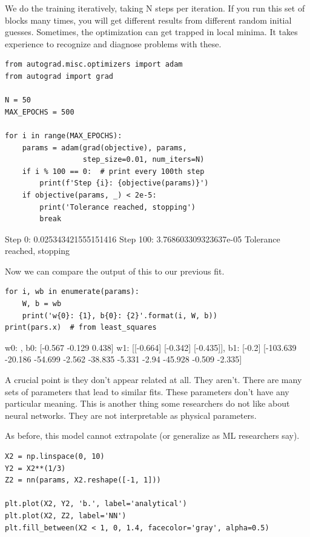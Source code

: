 \documentclass[11pt]{article}
\begin{document}
We do the training iteratively, taking N steps per iteration. If you run this set of blocks many times, you will get different results from different random initial guesses. Sometimes, the optimization can get trapped in local minima. It takes experience to recognize and diagnose problems with these.


\begin{verbatim}
from autograd.misc.optimizers import adam
from autograd import grad

N = 50
MAX_EPOCHS = 500

for i in range(MAX_EPOCHS):
    params = adam(grad(objective), params,
                  step_size=0.01, num_iters=N)
    if i % 100 == 0:  # print every 100th step
        print(f'Step {i}: {objective(params)}')
    if objective(params, _) < 2e-5:
        print('Tolerance reached, stopping')
        break
\end{verbatim}

Step 0: 0.025343421555151416
Step 100: 3.768603309323637e-05
Tolerance reached, stopping


Now we can compare the output of this to our previous fit.

\begin{verbatim}
for i, wb in enumerate(params):
    W, b = wb
    print('w{0}: {1}, b{0}: {2}'.format(i, W, b))
print(pars.x)  # from least_squares
\end{verbatim}

w0: , b0: [-0.567 -0.129  0.438]
w1: [[-0.664]
 [-0.342]
 [-0.435]], b1: [-0.2]
[-103.639  -20.186  -54.699   -2.562  -38.835   -5.331   -2.94   -45.928
   -0.509   -2.335]

A crucial point is they don't appear related at all. They aren't. There are many sets of parameters that lead to similar fits. These parameters don't have any particular meaning. This is another thing some researchers do not like about neural networks. They are not interpretable as physical parameters.

As before, this model cannot extrapolate (or generalize as ML researchers say).

\begin{verbatim}
X2 = np.linspace(0, 10)
Y2 = X2**(1/3)
Z2 = nn(params, X2.reshape([-1, 1]))

plt.plot(X2, Y2, 'b.', label='analytical')
plt.plot(X2, Z2, label='NN')
plt.fill_between(X2 < 1, 0, 1.4, facecolor='gray', alpha=0.5)
\end{verbatim}
\end{document}
